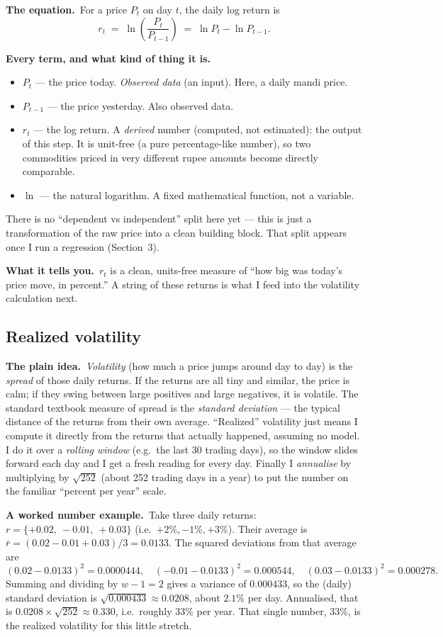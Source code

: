 \documentclass[11pt]{article}
\newcommand{\intuit}{\smallskip\noindent\textbf{The plain idea.}\ }
\newcommand{\example}{\smallskip\noindent\textbf{A worked number example.}\ }
\newcommand{\formula}{\smallskip\noindent\textbf{The equation.}\ }
\newcommand{\vars}{\smallskip\noindent\textbf{Every term, and what kind of thing it is.}\ }
\newcommand{\tells}{\smallskip\noindent\textbf{What it tells you.}\ }
\begin{document}
\formula For a price $P_t$ on day $t$, the daily log return is
\[
r_t \;=\; \ln\!\left(\frac{P_t}{P_{t-1}}\right) \;=\; \ln P_t - \ln P_{t-1}.
\]

\vars
\begin{itemize}
\item $P_t$ --- the price today. \emph{Observed data} (an input). Here, a daily mandi price.
\item $P_{t-1}$ --- the price yesterday. Also observed data.
\item $r_t$ --- the log return. A \emph{derived} number (computed, not estimated): the output of
this step. It is unit-free (a pure percentage-like number), so two commodities priced in very
different rupee amounts become directly comparable.
\item $\ln$ --- the natural logarithm. A fixed mathematical function, not a variable.
\end{itemize}
There is no ``dependent vs independent'' split here yet --- this is just a transformation of the
raw price into a clean building block. That split appears once I run a regression (Section~3).

\tells $r_t$ is a clean, units-free measure of ``how big was today's price move, in percent.'' A
string of these returns is what I feed into the volatility calculation next.

\subsection{Realized volatility}

\intuit \emph{Volatility} (how much a price jumps around day to day) is the \emph{spread} of
those daily returns. If the returns are all tiny and similar, the price is calm; if they swing
between large positives and large negatives, it is volatile. The standard textbook measure of
spread is the \emph{standard deviation} --- the typical distance of the returns from their own
average. ``Realized'' volatility just means I compute it directly from the returns that actually
happened, assuming no model. I do it over a \emph{rolling window} (e.g.\ the last 30 trading
days), so the window slides forward each day and I get a fresh reading for every day. Finally I
\emph{annualise} by multiplying by $\sqrt{252}$ (about 252 trading days in a year) to put the
number on the familiar ``percent per year'' scale.

\example Take three daily returns: $r = \{+0.02,\ -0.01,\ +0.03\}$ (i.e.\ $+2\%, -1\%, +3\%$).
Their average is $\bar r = (0.02 - 0.01 + 0.03)/3 = 0.0133$. The squared deviations from that
average are
\[
(0.02-0.0133)^2 = 0.0000444,\quad
(-0.01-0.0133)^2 = 0.000544,\quad
(0.03-0.0133)^2 = 0.000278.
\]
Summing and dividing by $w-1 = 2$ gives a variance of $0.000433$, so the (daily) standard
deviation is $\sqrt{0.000433} \approx 0.0208$, about $2.1\%$ per day. Annualised, that is
$0.0208 \times \sqrt{252} \approx 0.330$, i.e.\ roughly $33\%$ per year. That single number,
$33\%$, is the realized volatility for this little stretch.
\end{document}
